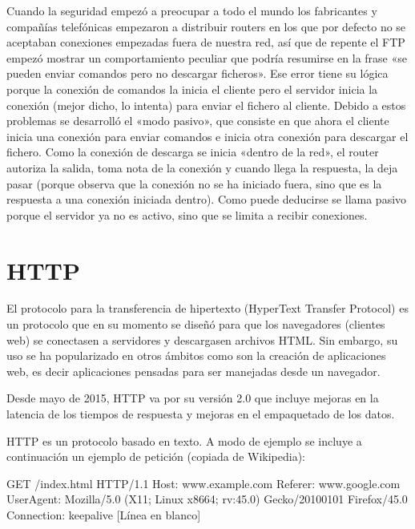 \documentclass[letterpaper,10pt,spanish]{sphinxmanual}
\begin{document}
Cuando la seguridad empezó a preocupar a todo el mundo los fabricantes y compañías telefónicas empezaron a distribuir routers en los que por defecto no se aceptaban conexiones empezadas fuera de nuestra red, así que de repente el FTP empezó mostrar un comportamiento peculiar que podría resumirse en la frase  «se pueden enviar comandos pero no descargar ficheros». Ese error tiene su lógica porque la conexión de comandos la inicia el cliente pero el servidor inicia la conexión (mejor dicho, lo intenta) para enviar el fichero al cliente. Debido a estos problemas  se desarrolló el  «modo pasivo», que consiste en que ahora el cliente inicia una conexión para enviar comandos e inicia otra conexión para descargar el fichero. Como la conexión de descarga se inicia «dentro de la red», el router autoriza la salida, toma nota de la conexión y cuando llega la respuesta, la deja pasar (porque observa que la conexión no se ha iniciado fuera, sino que es la respuesta a una conexión iniciada dentro). Como puede deducirse se llama pasivo porque el servidor ya no es activo, sino que se limita a recibir conexiones.


\section{HTTP}
\label{\detokenize{textos/tema4:http}}
El protocolo para la transferencia de hipertexto (HyperText Transfer Protocol) es un protocolo que en su momento se diseñó para que los navegadores (clientes web) se conectasen a servidores y descargasen archivos HTML. Sin embargo, su uso se ha popularizado en otros ámbitos como son la creación de aplicaciones web, es decir aplicaciones pensadas para ser manejadas desde un navegador.

Desde mayo de 2015, HTTP va por su versión 2.0 que incluye mejoras en la latencia de los tiempos de respuesta y mejoras en el empaquetado de los datos.

HTTP es un protocolo basado en texto.  A modo de ejemplo se incluye a continuación un ejemplo de petición (copiada de Wikipedia):

\begin{sphinxVerbatim}[commandchars=\\\{\}]
GET /index.html HTTP/1.1
Host: www.example.com
Referer: www.google.com
User\PYGZhy{}Agent: Mozilla/5.0 (X11; Linux x86\PYGZus{}64; rv:45.0) Gecko/20100101 Firefox/45.0
Connection: keep\PYGZhy{}alive
[Línea en blanco]
\end{sphinxVerbatim}
\end{document}
